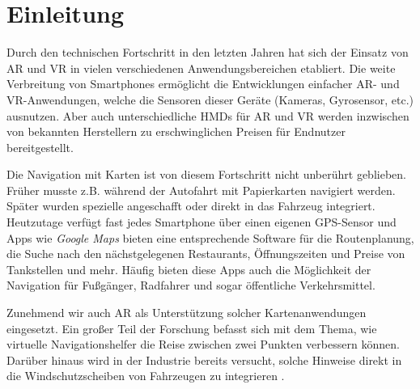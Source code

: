 \chapter{Einleitung}
Durch den technischen Fortschritt in den letzten Jahren hat sich der Einsatz von \gls{AR} und \gls{VR} in vielen verschiedenen Anwendungsbereichen etabliert.
Die weite Verbreitung von Smartphones ermöglicht die Entwicklungen einfacher \gls{AR}- und \gls{VR}-Anwendungen, welche die Sensoren dieser Geräte (Kameras, Gyrosensor, etc.) ausnutzen.
Aber auch unterschiedliche \glspl{HMD} für \gls{AR} und \gls{VR} werden inzwischen von bekannten Herstellern zu erschwinglichen Preisen für Endnutzer bereitgestellt.

Die Navigation mit Karten ist von diesem Fortschritt nicht unberührt geblieben.
Früher musste z.B. während der Autofahrt mit Papierkarten navigiert werden.
Später wurden spezielle  angeschafft oder direkt in das Fahrzeug integriert.
Heutzutage verfügt fast jedes Smartphone über einen eigenen \gls{GPS}-Sensor und Apps wie \emph{Google Maps} \parencite{GoogleLLC2018} bieten eine entsprechende Software für die Routenplanung, die Suche nach den nächstgelegenen Restaurants, Öffnungszeiten und Preise von Tankstellen und mehr.  
Häufig bieten diese Apps auch die Möglichkeit der Navigation für Fußgänger, Radfahrer und sogar öffentliche Verkehrsmittel.

Zunehmend wir auch \gls{AR} als Unterstützung solcher Kartenanwendungen eingesetzt.
Ein großer Teil der Forschung befasst sich mit dem Thema, wie virtuelle Navigationshelfer die Reise zwischen zwei Punkten verbessern können.
Darüber hinaus wird in der Industrie bereits versucht, solche Hinweise direkt in die Windschutzscheiben von Fahrzeugen zu integrieren \parencites{Cunningham2017}{Sygic2018}.

